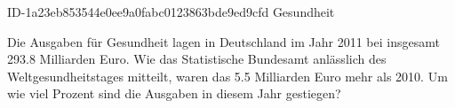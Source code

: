 \begin{exercise}
      {ID-1a23eb853544e0ee9a0fabc0123863bde9ed9cfd}
      {Gesundheit}
  \ifproblem\problem\par
    Die Ausgaben für Gesundheit lagen in Deutschland im Jahr 2011 bei insgesamt
    \num{293.8} Milliarden Euro. Wie das Statistische Bundesamt anlässlich des
    Weltgesundheitstages mitteilt, waren das \num{5.5} Milliarden Euro mehr als 2010.
    Um wie viel Prozent sind die Ausgaben in diesem Jahr gestiegen?
  \fi
\end{exercise}
